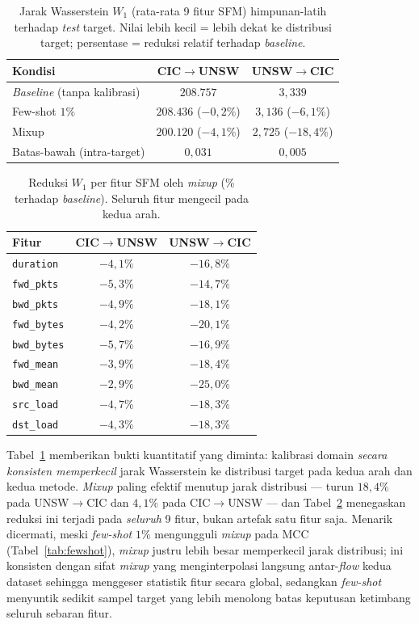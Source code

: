 \documentclass[11pt,a4paper]{article}
\begin{document}
\begin{table}[h]
\centering
\caption{Jarak Wasserstein $W_1$ (rata-rata 9 fitur SFM) himpunan-latih terhadap
\emph{test} target. Nilai lebih kecil = lebih dekat ke distribusi target;
persentase = reduksi relatif terhadap \emph{baseline}.}
\label{tab:wass}
\begin{tabular}{lcc}
\toprule
Kondisi & CIC$\rightarrow$UNSW & UNSW$\rightarrow$CIC \\
\midrule
\emph{Baseline} (tanpa kalibrasi) & $208{.}757$ & $3{,}339$ \\
Few-shot $1\%$        & $208{.}436$ ($-0{,}2\%$) & $3{,}136$ ($-6{,}1\%$) \\
Mixup                 & $200{.}120$ ($-4{,}1\%$) & $2{,}725$ ($-18{,}4\%$) \\
\midrule
Batas-bawah (intra-target) & $0{,}031$ & $0{,}005$ \\
\bottomrule
\end{tabular}
\end{table}

\begin{table}[h]
\centering
\caption{Reduksi $W_1$ per fitur SFM oleh \emph{mixup} (\% terhadap
\emph{baseline}). Seluruh fitur mengecil pada kedua arah.}
\label{tab:wassfeat}
\begin{tabular}{lcc}
\toprule
Fitur & CIC$\rightarrow$UNSW & UNSW$\rightarrow$CIC \\
\midrule
\texttt{duration}  & $-4{,}1\%$ & $-16{,}8\%$ \\
\texttt{fwd\_pkts}  & $-5{,}3\%$ & $-14{,}7\%$ \\
\texttt{bwd\_pkts}  & $-4{,}9\%$ & $-18{,}1\%$ \\
\texttt{fwd\_bytes} & $-4{,}2\%$ & $-20{,}1\%$ \\
\texttt{bwd\_bytes} & $-5{,}7\%$ & $-16{,}9\%$ \\
\texttt{fwd\_mean}  & $-3{,}9\%$ & $-18{,}4\%$ \\
\texttt{bwd\_mean}  & $-2{,}9\%$ & $-25{,}0\%$ \\
\texttt{src\_load}  & $-4{,}7\%$ & $-18{,}3\%$ \\
\texttt{dst\_load}  & $-4{,}3\%$ & $-18{,}3\%$ \\
\bottomrule
\end{tabular}
\end{table}

Tabel~\ref{tab:wass} memberikan bukti kuantitatif yang diminta: kalibrasi domain
\emph{secara konsisten memperkecil} jarak Wasserstein ke distribusi target pada
kedua arah dan kedua metode. \emph{Mixup} paling efektif menutup jarak
distribusi --- turun $18{,}4\%$ pada UNSW$\rightarrow$CIC dan $4{,}1\%$ pada
CIC$\rightarrow$UNSW --- dan Tabel~\ref{tab:wassfeat} menegaskan reduksi ini
terjadi pada \emph{seluruh} 9 fitur, bukan artefak satu fitur saja. Menarik
dicermati, meski \emph{few-shot} $1\%$ mengungguli \emph{mixup} pada MCC
(Tabel~\ref{tab:fewshot}), \emph{mixup} justru lebih besar memperkecil jarak
distribusi; ini konsisten dengan sifat \emph{mixup} yang menginterpolasi
langsung antar-\emph{flow} kedua dataset sehingga menggeser statistik fitur
secara global, sedangkan \emph{few-shot} menyuntik sedikit sampel target yang
lebih menolong batas keputusan ketimbang seluruh sebaran fitur.
\end{document}
